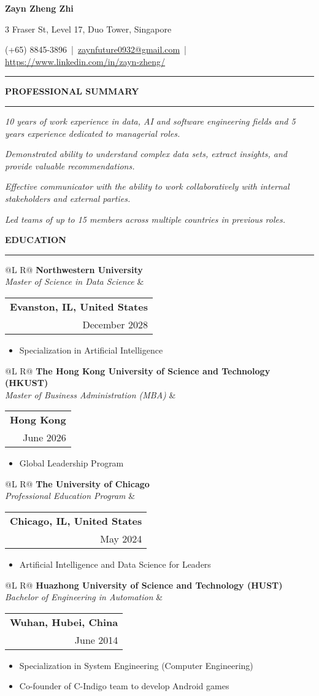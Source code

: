 \documentclass[a4paper,11pt]{article}
\makeatletter
\newcommand{\sectionhr}[1]{%
  \vspace{6pt}\textbf{\MakeUppercase{#1}}\par
  \vspace{2pt}\hrule\vspace{6pt}
}
\newcommand{\rightcol}[2]{\begin{tabular}{@{}r@{}} \textbf{#1}\\ #2 \end{tabular}}
\newcommand{\EduEntry}[5]{%
  \begin{tabularx}{\linewidth}{@{}L R@{}}
    \textbf{#1}\\ {\itshape #2} & \rightcol{#4}{#5}
  \end{tabularx}\par
  #3
  \vspace{6pt}
}
\makeatother
\begin{document}
\begin{center}
  {\LARGE \textbf{Zayn Zheng Zhi}}\par
  3 Fraser St, Level 17, Duo Tower, Singapore \par
  (+65) 8845-3896 \,|\, \href{mailto:zaynfuture0932@gmail.com}{zaynfuture0932@gmail.com} \,|\, \href{https://www.linkedin.com/in/zayn-zheng/}{https://www.linkedin.com/in/zayn-zheng/}
\end{center}

\hrule\vspace{8pt}

\sectionhr{Professional Summary}
\emph{10 years of work experience in data, AI and software engineering fields and 5 years experience dedicated to managerial roles.}

\emph{Demonstrated ability to understand complex data sets, extract insights, and provide valuable recommendations.}

\emph{Effective communicator with the ability to work collaboratively with internal stakeholders and external parties.}

\emph{Led teams of up to 15 members across multiple countries in previous roles.}

\sectionhr{Education}

\EduEntry
  {Northwestern University}
  {Master of Science in Data Science}
  {\begin{itemize}\item Specialization in Artificial Intelligence\end{itemize}}
  {Evanston, IL, United States}
  {December 2028}

\EduEntry
  {The Hong Kong University of Science and Technology (HKUST)}
  {Master of Business Administration (MBA)}
  {\begin{itemize}\item Global Leadership Program\end{itemize}}
  {Hong Kong}
  {June 2026}

\EduEntry
  {The University of Chicago}
  {Professional Education Program}
  {\begin{itemize}\item Artificial Intelligence and Data Science for Leaders\end{itemize}}
  {Chicago, IL, United States}
  {May 2024}

\EduEntry
  {Huazhong University of Science and Technology (HUST)}
  {Bachelor of Engineering in Automation}
  {\begin{itemize}
    \item Specialization in System Engineering (Computer Engineering)
    \item Co-founder of C-Indigo team to develop Android games
  \end{itemize}}
  {Wuhan, Hubei, China}
  {June 2014}
\end{document}
